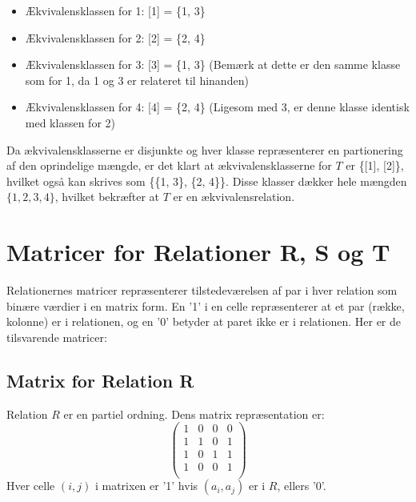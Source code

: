 \documentclass[12pt]{article}
\begin{document}
\begin{itemize}
    \item Ækvivalensklassen for 1: [1] = \{1, 3\}
    \item Ækvivalensklassen for 2: [2] = \{2, 4\}
    \item Ækvivalensklassen for 3: [3] = \{1, 3\} (Bemærk at dette er den samme klasse som for 1, da 1 og 3 er relateret til hinanden)
    \item Ækvivalensklassen for 4: [4] = \{2, 4\} (Ligesom med 3, er denne klasse identisk med klassen for 2)
\end{itemize}

Da ækvivalensklasserne er disjunkte og hver klasse repræsenterer en partionering af den oprindelige mængde, er det klart at ækvivalensklasserne for \( T \) er \{[1], [2]\}, hvilket også kan skrives som \{\{1, 3\}, \{2, 4\}\}. Disse klasser dækker hele mængden \( \{1, 2, 3, 4\} \), hvilket bekræfter at \( T \) er en ækvivalensrelation.


\section{Matricer for Relationer R, S og T}
Relationernes matricer repræsenterer tilstedeværelsen af par i hver relation som binære værdier i en matrix form. En '1' i en celle repræsenterer at et par (række, kolonne) er i relationen, og en '0' betyder at paret ikke er i relationen. Her er de tilsvarende matricer:

\subsection{Matrix for Relation R}
Relation \( R \) er en partiel ordning. Dens matrix repræsentation er:
\[
\begin{pmatrix}
1 & 0 & 0 & 0 \\
1 & 1 & 0 & 1 \\
1 & 0 & 1 & 1 \\
1 & 0 & 0 & 1 \\
\end{pmatrix}
\]
Hver celle \( (i, j) \) i matrixen er '1' hvis \( (a_i, a_j) \) er i \( R \), ellers '0'.
\end{document}
